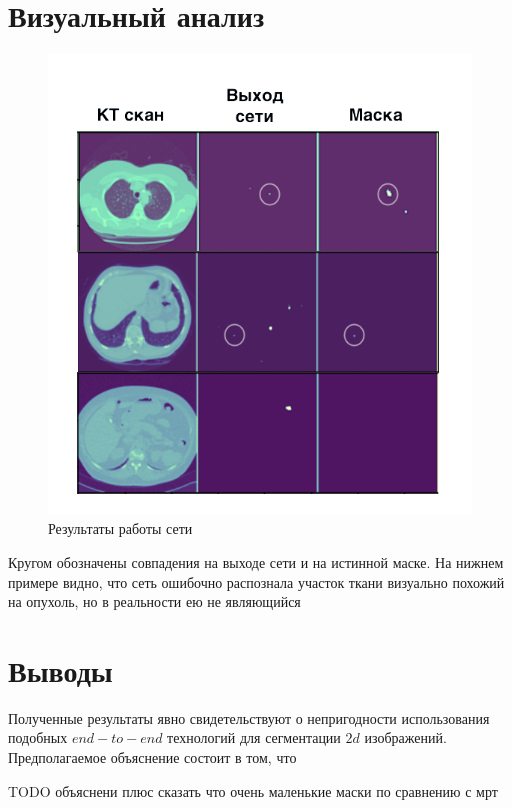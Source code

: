 \section{Визуальный анализ}

\begin{figure}[!h]
\includegraphics[width=\linewidth]{images/2d-seg-results.png}
\caption{Результаты работы сети}\label{mirskiy-cgan-architecture}
\centering
\end{figure}

Кругом обозначены совпадения на выходе сети и на истинной маске. На нижнем примере видно, что сеть ошибочно распознала участок ткани визуально похожий на опухоль, но в реальности ею не являющийся

\section{Выводы}

Полученные результаты явно свидетельствуют о непригодности использования подобных $end-to-end$ технологий для сегментации $2d$ изображений. Предполагаемое объяснение состоит в том, что 

TODO объяснени плюс сказать что очень маленькие маски по сравнению с мрт